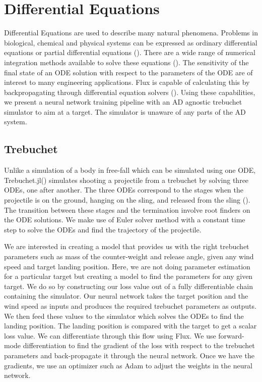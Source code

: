 \documentclass{juliacon}
\begin{document}
\section{Differential Equations}
\label{sec:trebuchet}

Differential Equations are used to describe many natural phenomena. Problems in biological, chemical and physical systems can be expressed as ordinary differential equations or partial differential equations (). There are a wide range of numerical integration methods available to solve these equations (). The sensitivity of the final state of an ODE solution with respect to the parameters of the ODE are of interest to many engineering applications. Flux is capable of calculating this by backpropagating through differential equation solvers (). Using these capabilities, we present a neural network training pipeline with an AD agnostic trebuchet simulator to aim at a target. The simulator is unaware of any parts of the AD system.

\subsection{Trebuchet}


Unlike a simulation of a body in free-fall which can be simulated using one ODE, Trebuchet.jl() simulates shooting a projectile from a trebuchet by solving three ODEs, one after another. The three ODEs correspond to the stages when the projectile is on the ground, hanging on the sling, and released from the sling (). The transition between these stages and the termination involve root finders on the ODE solutions. We make use of Euler solver method with a constant time step to solve the ODEs and find the trajectory of the projectile. 

We are interested in creating a model that provides us with the right trebuchet parameters such as mass of the counter-weight and release angle, given any wind speed and target landing position. Here, we are not doing parameter estimation for a particular target but creating a model to find the parameters for any given target. We do so by constructing our loss value out of a fully differentiable chain containing the simulator. Our neural network takes the target position and the wind speed as inputs and produces the required trebuchet parameters as outputs. We then feed these values to the simulator which solves the ODEs to find the landing position. The landing position is compared with the target to get a scalar loss value. We can differentiate through this flow using Flux. We use forward-mode differentiation to find the gradient of the loss with respect to the trebuchet parameters and back-propagate it through the neural network. Once we have the gradients, we use an optimizer such as Adam to adjust the weights in the neural network.
\end{document}
